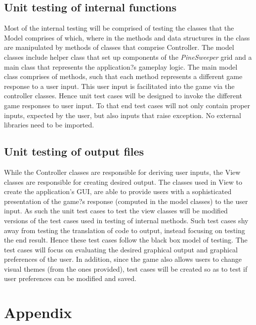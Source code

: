 \documentclass[12pt, titlepage]{article}
\begin{document}
\subsection{Unit testing of internal functions}
Most of the internal testing will be comprised of testing the classes that the Model comprises of which, where in the methods and data structures in the class are manipulated by methods of classes that comprise Controller. The model classes include helper class that set up components of the \textit{PineSweeper} grid and a main class that represents the application?s gameplay logic. The main model class comprises of methods, such that each method represents a different game response to a user input. This user input is facilitated into the game via the controller classes. Hence unit test cases will be designed to invoke the different game responses to user input. To that end test cases will not only contain proper inputs, expected by the user, but also inputs that raise exception. No external libraries need to be imported.

\subsection{Unit testing of output files}
While the Controller classes are responsible for deriving user inputs, the View classes are responsible for creating desired output. The classes used in View to create the application's GUI, are able to provide users with a sophisticated presentation of the game?s response (computed in the model classes) to the user input. As such the unit test cases to test the view classes will be modified versions of the test cases used in testing of internal methods. Such test cases shy away from testing the translation of code to output, instead focusing on testing the end result. Hence these test cases follow the black box model of testing. The test cases will focus on evaluating the desired graphical output and graphical preferences of the user. In addition, since the game also allows users to change visual themes (from the ones provided), test cases will be created so as to test if user preferences can be modified and saved.
	



\newpage
\section{Appendix}
\end{document}
